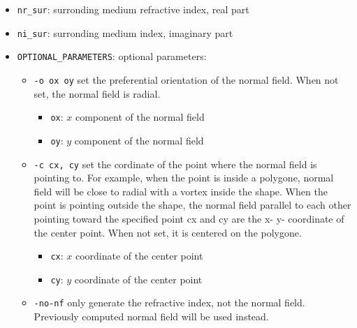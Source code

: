 \begin{itemize}
\begin{itemize}
        	where:
		    \begin{itemize}
	    		\item \lstinline!nr_shape!: shape refractive index, real part
				\item \lstinline!ni_shape!: shape refractive index, imaginary part
				\item \lstinline!nb_edges!: number of edged of the polygone
				\item \lstinline!x!: for each edge define the $x$ coordinate
				\item \lstinline!y!: for each edge define the $y$ coordinate
	    	\end{itemize}  	
	\end{itemize}
\item \lstinline!nr_sur!: surronding medium refractive index, real part
\item \lstinline!ni_sur!: surronding medium index, imaginary part
\item \lstinline!OPTIONAL_PARAMETERS!: optional parameters:
    \begin{itemize}
    	\item \lstinline!-o ox oy! set the preferential orientation of the normal field. When not set, the normal field is radial.
			\begin{itemize}
				\item \lstinline!ox!: $x$ component of the normal field
				\item \lstinline!oy!: $y$ component of the normal field
			\end{itemize}	
    	\item \lstinline!-c cx, cy! set the cordinate of the point where the normal field is pointing to.
    		For example, when the point is inside a polygone,
            normal field will be close to radial with a vortex inside the
            shape. When the point is pointing outside the shape, the 
            normal field parallel to each other pointing toward the specified point 
            cx and cy are the x- y- coordinate of the center point.
            When not set, it is centered on the polygone.

			\begin{itemize}
				\item \lstinline!cx!: $x$ coordinate of the center point
				\item \lstinline!cy!: $y$ coordinate of the center point
			\end{itemize}	
    	\item \lstinline!-no-nf! only generate the refractive index, not the  
             normal field. Previously computed normal field will be used instead.

	\end{itemize}
\end{itemize}


